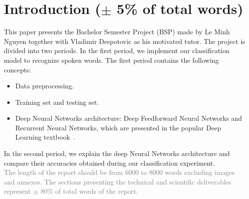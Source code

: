 \section{Introduction ($\pm$ 5\% of total words)}

This paper presents the Bachelor Semester Project (BSP) made by Le Minh Nguyen
together with Vladimir Despotovic as his motivated tutor. The project is divided
into two periods. In the first period, we implement our classification model to
recognize spoken words. The first period contains the following concepts:\\

\begin{itemize}
\item Data preprocessing.
\item Training set and testing set.
\item Deep Neural Networks architecture: Deep Feedforward Neural Networks and
  Recurrent Neural Networks, which are presented in the popular Deep Learning
  textbook~\cite{Goodfellow-et-al-2016}.
\end{itemize}

In the second period, we explain the deep Neural Networks architecture and compare their
accuracies obtained during our classification experiment.\\

\textcolor{gray}{The length of the report should be from 6000 to 8000 words
  excluding images and annexes. The sections presenting the technical and
  scientific deliverables represent $\pm$ 80\% of total words of the report.}
